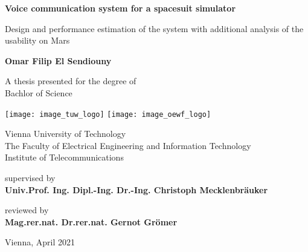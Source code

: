 \begin{titlepage}
	\begin{center}
		\vspace*{1cm}
		
		\LARGE
		\textbf{Voice communication system for a spacesuit simulator}
		
		\vspace{0.5cm}	%
		\Large
		Design and performance estimation of the system with additional analysis of the usability on Mars 
		
		\vspace{1.5cm}
		\normalsize
		\textbf{Omar Filip El Sendiouny}
		
		\vfill
		
		\small
		A thesis presented for the degree of\\
		Bachlor of Science
		
		\vspace{0.8cm}
		\texttt{[image: image\_tuw\_logo]} \hspace{1.8cm}
		\texttt{[image: image\_oewf\_logo]}
		
		\vspace{0.8cm}
		\small
		Vienna University of Technology\\
		The Faculty of Electrical Engineering and Information Technology\\
		Institute of Telecommunications
		
		\vspace{0.8cm}
		\normalsize
		supervised by\\
		\textbf{Univ.Prof. Ing. Dipl.-Ing. Dr.-Ing. Christoph Mecklenbräuker}
		
		\vspace{0.8cm}
		reviewed by\\
		\textbf{Mag.rer.nat. Dr.rer.nat. Gernot Grömer}
		
		\small
		\vspace{2.4cm}
		Vienna, April 2021
		
	\end{center}
\end{titlepage}
